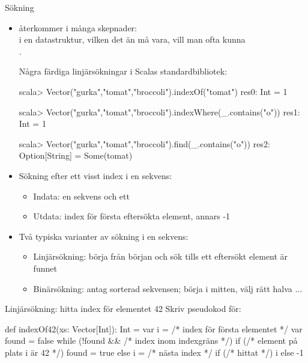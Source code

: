 

\ifkompendium\else

\begin{Slide}{Sökning}\SlideFontSmall

\begin{itemize}
\item {} återkommer i många skepnader: \\ i en datastruktur, vilken det än må vara, vill man ofta kunna \\ . 

\pause
Några färdiga linjärsökningar i Scalas standardbibliotek:

\begin{REPL}
scala> Vector("gurka","tomat","broccoli").indexOf("tomat")
res0: Int = 1

scala> Vector("gurka","tomat","broccoli").indexWhere(_.contains("o"))
res1: Int = 1

scala> Vector("gurka","tomat","broccoli").find(_.contains("o"))
res2: Option[String] = Some(tomat)
\end{REPL}

\pause
\item Sökning efter ett visst index i en sekvens:

\begin{itemize}\SlideFontTiny
\item Indata: en sekvens och ett 
\item Utdata: index för första eftersökta element, annars -1 
\end{itemize}

\pause
\item Två typiska varianter av sökning i en sekvens:
\begin{itemize}\SlideFontTiny
\item Linjärsökning: börja från början och sök tills ett eftersökt element är funnet
\item Binärsökning: antag sorterad sekvensen; börja i mitten, välj rätt halva ...
\end{itemize}
\end{itemize}
\end{Slide}


\begin{Slide}{Linjärsökning: hitta index för elementet 42}
Skriv pseudokod för:\\ 
\pause
\begin{Code}
def indexOf42(xs: Vector[Int]): Int = {
  var i = /* index för första elementet */
  var found = false
  while (!found && /* index inom indexgräns */) {
    if (/* element på plats i är 42 */) found = true 
    else i = /* nästa index */
  }
  if (/* hittat */) i else -1
} 
\end{Code}
\end{Slide}

